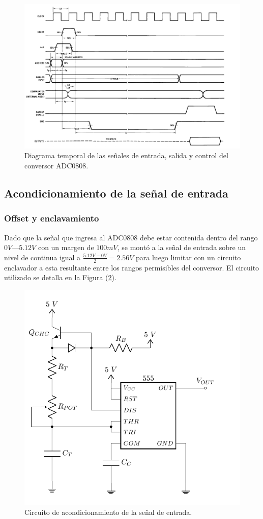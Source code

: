 \begin{figure}[H]
\centering
\includegraphics[width=0.9\linewidth]{ImagenesEjercicio1/ADC_TIMING.png}
\caption{Diagrama temporal de las señales de entrada, salida y control del conversor ADC0808.}
\label{ADC_TIMING}
\end{figure}

\subsection{Acondicionamiento de la señal de entrada}

\subsubsection{Offset y enclavamiento}

Dado que la señal que ingresa al ADC0808 debe estar contenida dentro del rango $0V$—$5.12V$ con un margen de $100mV$, se montó a la señal de entrada sobre un nivel de continua igual a $\frac{5.12V - 0V}{2} = 2.56V$ para luego limitar con un circuito enclavador a esta resultante entre los rangos permisibles del conversor. El circuito utilizado se detalla en la Figura (\ref{ACOND}).

\begin{figure}[H]
\centering
\includegraphics[width=0.7\linewidth, page = 3]{ImagenesEjercicio1/Components.pdf}
\caption{Circuito de acondicionamiento de la señal de entrada.}
\label{ACOND}
\end{figure}

